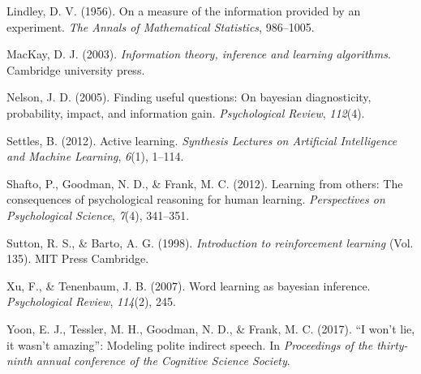 \documentclass[10pt, letterpaper]{article}
\begin{document}
\hypertarget{ref-lindley1956}{}
Lindley, D. V. (1956). On a measure of the information provided by an
experiment. \emph{The Annals of Mathematical Statistics}, 986--1005.

\hypertarget{ref-mackay2003}{}
MacKay, D. J. (2003). \emph{Information theory, inference and learning
algorithms}. Cambridge university press.

\hypertarget{ref-nelson2005}{}
Nelson, J. D. (2005). Finding useful questions: On bayesian
diagnosticity, probability, impact, and information gain.
\emph{Psychological Review}, \emph{112}(4).

\hypertarget{ref-settles2012active}{}
Settles, B. (2012). Active learning. \emph{Synthesis Lectures on
Artificial Intelligence and Machine Learning}, \emph{6}(1), 1--114.

\hypertarget{ref-shafto2012learning}{}
Shafto, P., Goodman, N. D., \& Frank, M. C. (2012). Learning from
others: The consequences of psychological reasoning for human learning.
\emph{Perspectives on Psychological Science}, \emph{7}(4), 341--351.

\hypertarget{ref-sutton1998}{}
Sutton, R. S., \& Barto, A. G. (1998). \emph{Introduction to
reinforcement learning} (Vol. 135). MIT Press Cambridge.

\hypertarget{ref-xu2007}{}
Xu, F., \& Tenenbaum, J. B. (2007). Word learning as bayesian inference.
\emph{Psychological Review}, \emph{114}(2), 245.

\hypertarget{ref-yoon2017}{}
Yoon, E. J., Tessler, M. H., Goodman, N. D., \& Frank, M. C. (2017). ``I
won't lie, it wasn't amazing'': Modeling polite indirect speech. In
\emph{Proceedings of the thirty-ninth annual conference of the Cognitive
Science Society}.
\end{document}
